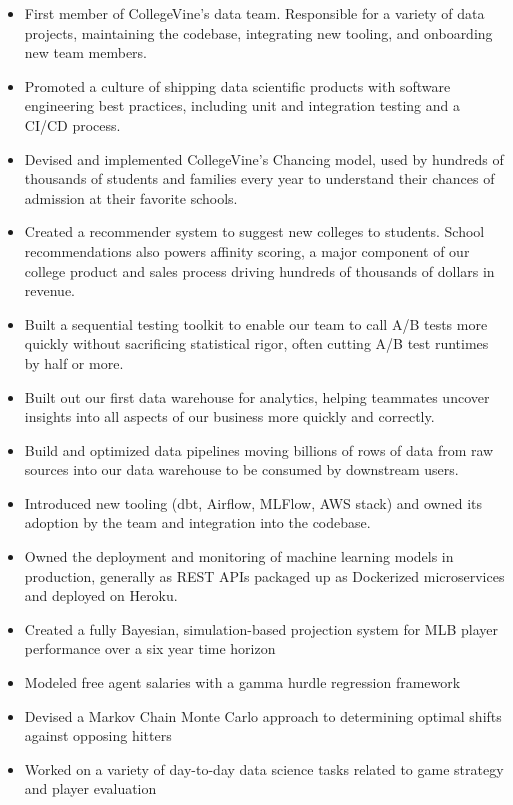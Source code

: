 \documentclass[10pt,a4paper,ragged2e,withhyper]{/Users/matt/documents/GitHub/mrkaye97.github.io/resume/altacv}
\begin{document}
	


	 \makecvheader
		
	
		\begin{itemize}
		\item First member of CollegeVine's data team. Responsible for a variety of data projects, maintaining the codebase, integrating new tooling, and onboarding new team members. 
		\item Promoted a culture of shipping data scientific products with software engineering best practices, including unit and integration testing and a CI/CD process.
		\item Devised and implemented CollegeVine's Chancing model, used by hundreds of thousands of students and families every year to understand their chances of admission at their favorite schools.
		\item Created a recommender system to suggest new colleges to students. School recommendations also powers affinity scoring, a major component of our college product and sales process driving hundreds of thousands of dollars in revenue.
		\item Built a sequential testing toolkit to enable our team to call A/B tests more quickly without sacrificing statistical rigor, often cutting A/B test runtimes by half or more.
		\item Built out our first data warehouse for analytics, helping teammates uncover insights into all aspects of our business more quickly and correctly.
		\item Build and optimized data pipelines moving billions of rows of data from raw sources into our data warehouse to be consumed by downstream users.
		\item Introduced new tooling (dbt, Airflow, MLFlow, AWS stack) and owned its adoption by the team and integration into the codebase.
		\item Owned the deployment and monitoring of machine learning models in production, generally as REST APIs packaged up as Dockerized microservices and deployed on Heroku.
		\end{itemize}
		
		\divider
		

		\begin{itemize}
		\item Created a fully Bayesian, simulation-based projection system for MLB player performance over a six year time horizon
		\item Modeled free agent salaries with a gamma hurdle regression framework
		\item Devised a Markov Chain Monte Carlo approach to determining optimal shifts against opposing hitters
		\item Worked on a variety of day-to-day data science tasks related to game strategy and player evaluation
		\end{itemize}
		
\end{document}
